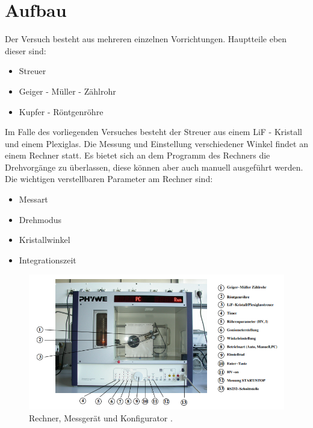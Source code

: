 \section{Aufbau}
Der Versuch besteht aus mehreren einzelnen Vorrichtungen. Hauptteile eben dieser sind:
\begin{itemize}
\item{Streuer}
\item{Geiger - Müller - Zählrohr}
\item{Kupfer - Röntgenröhre}
\end{itemize}
Im Falle des vorliegenden Versuches besteht der Streuer aus einem LiF - Kristall und einem Plexiglas. 
Die Messung und Einstellung verschiedener Winkel findet an einem Rechner statt. Es bietet sich an dem Programm des Rechners 
die Drehvorgänge zu überlassen, diese können aber auch manuell ausgeführt werden. 
Die wichtigen verstellbaren Parameter am Rechner sind:
\begin{itemize}
\item{Messart}
\item{Drehmodus}
\item{Kristallwinkel}
\item{Integrationszeit}
\end{itemize}
 
\begin{figure}
    \centering
    \includegraphics[width=\textwidth]{bilder/Screenshot 2021-01-29 104244.png}
    \caption{Rechner, Messgerät und Konfigurator \cite{skript}. } 
    \label{fig:Rechner}
\end{figure}

